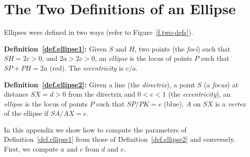 
\chapter{The Two Definitions of an Ellipse}\label{s.two-defs}

Ellipses were defined in two ways (refer to Figure~\ref{f.two-defs}).

\textbf{Definition~\ref{def.ellipse1}:} 
Given $S$ and $H$, two points (the \emph{foci}) such that $SH=2c>0$, and $2a>2c>0$, an \emph{ellipse} is the locus of points $P$ such that $SP+PH=2a$ (red). The \emph{eccentricity} is $c/a$.

\textbf{Definition~\ref{def.ellipse2}:} 
Given a line (the \emph{directrix}), a point $S$ (a \emph{focus}) at distance $SX=d>0$ from the directrix and $0<e<1$ (the \emph{eccentricity}), an \emph{ellipse} is the locus of points $P$ such that $SP/PK=e$ (blue). $A$ on $SX$ is a \emph{vertex} of the ellipse if $SA/AX=e$.

In this appendix we show how to compute the parameters of Definition~\ref{def.ellipse1} from those of Definition~\ref{def.ellipse2} and conversely. First, we compute $a$ and $c$ from $d$ and $e$.


